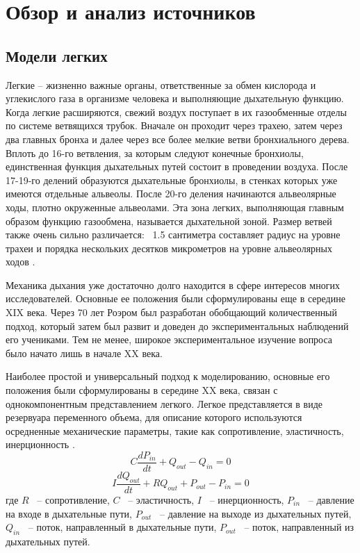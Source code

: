 \chapter{Обзор и анализ источников}
\section{Модели легких}
Легкие – жизненно важные органы, ответственные за обмен кислорода и углекислого газа в организме человека и выполняющие дыхательную функцию. Когда легкие расширяются, свежий воздух поступает в их газообменные отделы по системе ветвящихся трубок. Вначале он проходит через трахею, затем через два главных бронха и далее через все более мелкие ветви бронхиального дерева. Вплоть до 16-го ветвления, за которым следуют конечные бронхиолы, единственная функция дыхательных путей состоит в проведении воздуха. После 17-19-го делений образуются дыхательные бронхиолы, в стенках которых уже имеются отдельные альвеолы. После 20-го деления начинаются альвеолярные ходы, плотно окруженные альвеолами. Эта зона легких, выполняющая главным образом функцию газообмена, называется дыхательной зоной. Размер ветвей также очень сильно различается: ~1.5 сантиметра составляет радиус на уровне трахеи и порядка нескольких десятков микрометров на уровне альвеолярных ходов \cite{schmidt}.

Механика дыхания уже достаточно долго находится в сфере интересов многих исследователей. Основные ее положения были сформулированы еще в середине XIX века. Через 70 лет Роэром был разработан обобщающий количественный подход, который затем был развит и доведен до экспериментальных наблюдений его учениками. Тем не менее, широкое экспериментальное изучение вопроса было начато лишь в начале XX века.

Наиболее простой и универсальный подход к моделированию, основные его положения были сформулированы в середине XX века, связан с однокомпонентным представлением легкого.
Легкое представляется в виде резервуара переменного объема, для описание которого используются осредненные механические параметры, такие как сопротивление, эластичность, инерционность \cite{Dyachenko1986}.
\begin{equation}
    C\frac{dP_{in}}{dt}+Q_{out}-Q_{in}=0
\end{equation}
\begin{equation}
    I\frac{dQ_{out}}{dt}+RQ_{out}+P_{out}-P_{in}=0
\end{equation}
где $R$ ~-- сопротивление, $C$ ~-- эластичность,  $I$ ~-- инерционность, $P_{in}$ ~-- давление на входе в дыхательные пути, $P_{out}$ ~-- давление на выходе из дыхательных путей, $Q_{in}$ ~-- поток, направленный в дыхательные пути, $P_{out}$ ~-- поток, направленный из дыхательных путей.   

